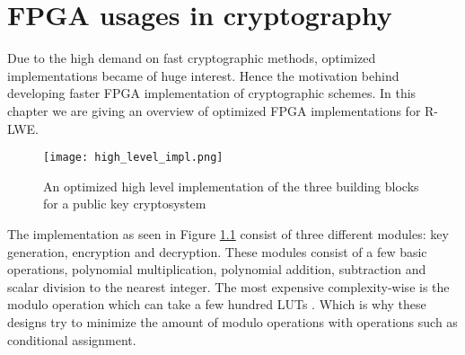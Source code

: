 \chapter{FPGA usages in cryptography\label{FPGA_crypto}}
Due to the high demand on fast cryptographic methods, optimized implementations
became of huge interest. Hence the motivation behind developing faster FPGA
implementation of cryptographic schemes. In this chapter we are giving an
overview of optimized FPGA implementations for R-LWE.

\begin{figure}[H]

    \texttt{[image: high\_level\_impl.png]}
    \caption{An optimized high level implementation of the three building
    blocks for a public key cryptosystem \citep{FPGA_Post_Quantum_Primitives}}
    \label{fig:high_level_pkc_impl}

\end{figure}

The implementation as seen in Figure \ref{fig:high_level_pkc_impl} consist of
three different modules: key generation, encryption and decryption. These
modules consist of a few basic operations, polynomial multiplication,
polynomial addition, subtraction and scalar division to the nearest integer.
The most expensive complexity-wise is the modulo operation which can take a few
hundred LUTs \citep{FPGA_Post_Quantum_Primitives}. Which is why these designs
try to minimize the amount of modulo operations with operations such as
conditional assignment.


